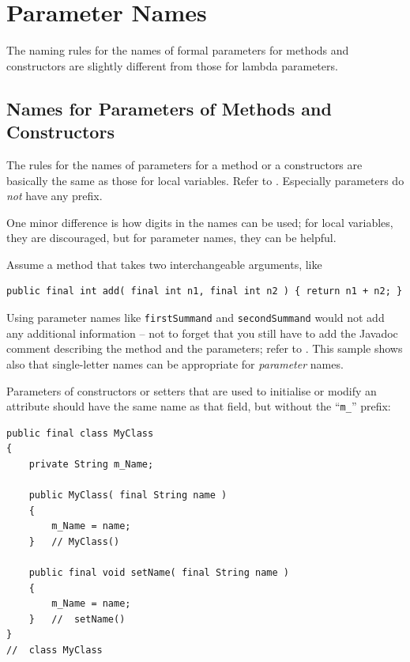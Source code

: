\section{Parameter Names}
The naming rules for the names of formal parameters for methods and constructors are slightly  different from those for lambda parameters.


\subsection{Names for Parameters of Methods and Constructors}\label{sec:NamesForFormalParameters}
The rules for the names of parameters for a method or a constructors are basically the same as those for local variables. Refer to . Especially parameters do \textit{not} have any prefix.

One minor difference is how digits in the names can be used; for local variables, they are discouraged, but for parameter names, they can be helpful.

Assume a method that takes two interchangeable arguments, like
\begin{lstlisting}
public final int add( final int n1, final int n2 ) { return n1 + n2; }
\end{lstlisting}
Using parameter names like \lstinline|firstSummand| and \lstinline|secondSummand| would not add any additional information – not to forget that you still have to add the Javadoc comment describing the method and the parameters; refer to . This sample shows also that single-letter names can be appropriate for \textit{parameter} names.

Parameters of constructors or setters that are used to initialise or modify an attribute should have the same name as that field, but without the “\verb#m_#” prefix:
\begin{lstlisting}
public final class MyClass
{
    private String m_Name;
    
    public MyClass( final String name )
    {
        m_Name = name;
    }   // MyClass()
    
    public final void setName( final String name )
    {
        m_Name = name;
    }   //  setName()
}
//  class MyClass
\end{lstlisting}


